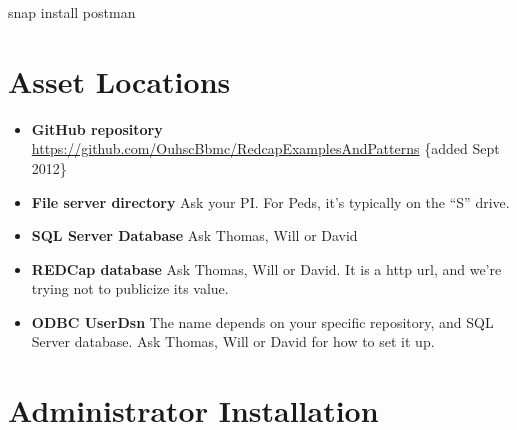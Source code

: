 \documentclass[
]{book}
\newenvironment{Shaded}{\begin{snugshade}}{\end{snugshade}}
\newcommand{\ExtensionTok}[1]{#1}
\newcommand{\NormalTok}[1]{#1}
\begin{document}
\begin{Shaded}
\begin{Highlighting}[]
\ExtensionTok{snap}\NormalTok{ install postman}
\end{Highlighting}
\end{Shaded}

\hypertarget{asset-locations}{%
\section{Asset Locations}\label{asset-locations}}

\begin{itemize}
\item
  \textbf{GitHub repository} \url{https://github.com/OuhscBbmc/RedcapExamplesAndPatterns} \{added Sept 2012\}
\item
  \textbf{File server directory} Ask your PI. For Peds, it's typically on the ``S'' drive.
\item
  \textbf{SQL Server Database} Ask Thomas, Will or David
\item
  \textbf{REDCap database} Ask Thomas, Will or David. It is a http url, and we're trying not to publicize its value.
\item
  \textbf{ODBC UserDsn} The name depends on your specific repository, and SQL Server database. Ask Thomas, Will or David for how to set it up.
\end{itemize}

\hypertarget{installation-administrator}{%
\section{Administrator Installation}\label{installation-administrator}}
\end{document}
